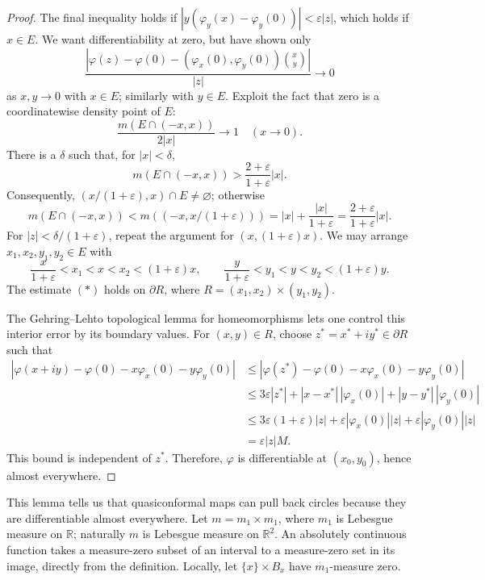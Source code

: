 \documentclass[11pt,a4paper]{article}
\begin{document}
\begin{proof}
The final inequality holds if
\(|y(\varphi_y(x)-\varphi_y(0))|<\varepsilon|z|\), which holds if \(x\in E\).
We want differentiability at zero, but have shown only
\[
\frac{\left|\varphi(z)-\varphi(0)
-(\varphi_x(0),\varphi_y(0))\binom xy\right|}{|z|}\longrightarrow0
\]
as \(x,y\to0\) with \(x\in E\); similarly with \(y\in E\).
Exploit the fact that zero is a coordinatewise density point of \(E\):
\[
\frac{m(E\cap(-x,x))}{2|x|}\longrightarrow1\quad(x\to0).
\]
There is a \(\delta\) such that, for \(|x|<\delta\),
\[
m(E\cap(-x,x))>\frac{2+\varepsilon}{1+\varepsilon}|x|.
\]
Consequently, \((x/(1+\varepsilon),x)\cap E\ne\varnothing\); otherwise
\[
m(E\cap(-x,x))<m((-x,x/(1+\varepsilon)))
=|x|+\frac{|x|}{1+\varepsilon}
=\frac{2+\varepsilon}{1+\varepsilon}|x|.
\]
For \(|z|<\delta/(1+\varepsilon)\), repeat the argument for \((x,(1+\varepsilon)x)\). We may arrange \(x_1,x_2,y_1,y_2\in E\) with
\[
\frac{x}{1+\varepsilon}<x_1<x<x_2<(1+\varepsilon)x,\qquad
\frac{y}{1+\varepsilon}<y_1<y<y_2<(1+\varepsilon)y.
\]
The estimate \((*)\) holds on \(\partial R\), where \(R=(x_1,x_2)\times(y_1,y_2)\).

The Gehring--Lehto topological lemma for homeomorphisms lets one control this interior error by its boundary values. For \((x,y)\in R\), choose \(z^*=x^*+iy^*\in\partial R\) such that
\[
\begin{aligned}
|\varphi(x+iy)-\varphi(0)-x\varphi_x(0)-y\varphi_y(0)|
&\le|\varphi(z^*)-\varphi(0)-x\varphi_x(0)-y\varphi_y(0)|\\
&\le3\varepsilon|z^*|+|x-x^*|\,|\varphi_x(0)|
+|y-y^*|\,|\varphi_y(0)|\\
&\le3\varepsilon(1+\varepsilon)|z|
+\varepsilon|\varphi_x(0)||z|
+\varepsilon|\varphi_y(0)||z|\\
&=\varepsilon|z|M.
\end{aligned}
\]
This bound is independent of \(z^*\). Therefore, \(\varphi\) is differentiable at \((x_0,y_0)\), hence almost everywhere.
\end{proof}

This lemma tells us that quasiconformal maps can pull back circles because they are differentiable almost everywhere. Let \(m=m_1\times m_1\), where \(m_1\) is Lebesgue measure on \(\mathbb R\); naturally \(m\) is Lebesgue measure on \(\mathbb R^2\).
An absolutely continuous function takes a measure-zero subset of an interval to a measure-zero set in its image, directly from the definition.
Locally, let \(\{x\}\times B_x\) have \(m_1\)-measure zero.
\end{document}

